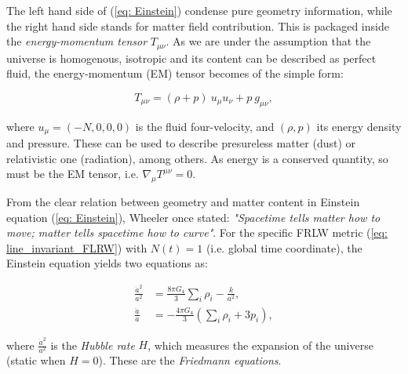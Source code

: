 \documentclass[11pt, a4paper]{article} %
\begin{document}
The left hand side of (\ref{eq: Einstein}) condense pure geometry information, while the right hand side stands for matter field contribution. This is packaged inside the \textit{energy-momentum tensor} $T_{\mu\nu}$. As we are under the assumption that the universe is homogenous, isotropic and its content can be described as perfect fluid, the energy-momentum (EM) tensor becomes of the simple form:

\begin{equation}\label{eq: EMtensor}
	T_{\mu \nu} = (\rho + p) \:u_{\mu}u_{\nu} + p\: g_{\mu\nu},
\end{equation}

where $u_{\mu} = \left(-N, 0, 0, 0\right)$ is the fluid four-velocity, and $(\rho, p)$ its energy density and pressure. These can be used to describe presureless matter (dust) or relativistic one (radiation), among others. As energy is a conserved quantity, so must be the EM tensor, i.e. $\nabla_{\mu}T^{\mu \nu} =0$. 

From the clear relation between geometry and matter content in Einstein equation (\ref{eq: Einstein}), Wheeler once stated: \textit{"Spacetime tells matter how to move; matter tells spacetime how to curve"}. For the specific FRLW metric (\ref{eq: line_invariant_FLRW}) with $N(t) = 1$ (i.e. global time coordinate), the Einstein equation yields two equations as:

\begin{align}
	\label{eq: Friedmann1} \frac{\dot{a}^{2}}{a^{2}} &= \frac{8 \pi G_{4}}{3}\sum_{i} \rho_{i} - \frac{k}{a^{2}},\\
	\label{eq: Friedmann2} \frac{\ddot{a}}{a} &= -\frac{4 \pi G_{4}}{3} \left(\sum_{i} \rho_{i} + 3 p_{i}\right),
\end{align}

where $\frac{\dot{a}^{2}}{a^{2}}$ is the \textit{Hubble rate} $H$, which measures the expansion of the universe (static when $H = 0$). These are the \textit{Friedmann equations}.
\end{document}
